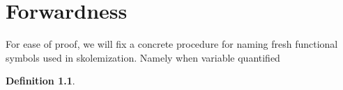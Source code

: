 \documentclass[english, shortabstract]{iithesis}
\theoremstyle{definition} \newtheorem{definition}{Definition}[chapter]
\theoremstyle{remark} \newtheorem{remark}[definition]{Observation}
\theoremstyle{plain} \newtheorem{theorem}[definition]{Theorem}
\theoremstyle{plain} \newtheorem{lemma}[definition]{Lemma}
\begin{document}


    

\chapter{Forwardness}
For ease of proof, we will fix a concrete procedure for naming fresh functional symbols used in skolemization. 
Namely when variable quantified 

\begin{definition} 
\end{definition}


\end{document}
